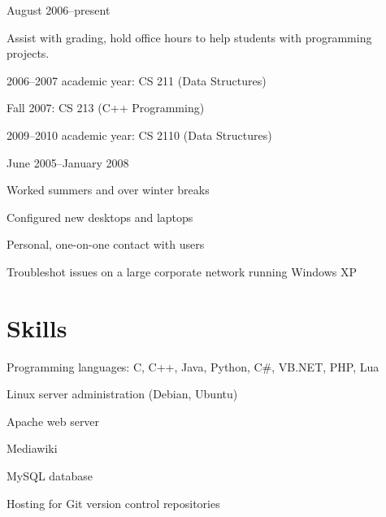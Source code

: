 \documentclass[11pt]{resume}
\begin{document}
	{August 2006--present}
	\begin{compactitem}
	\item Assist with grading, hold office hours to help students with programming
	projects.
	\item 2006--2007 academic year: CS 211 (Data Structures)
	\item Fall 2007: CS 213 (C++ Programming)
	\item 2009--2010 academic year: CS 2110 (Data Structures)
	\end{compactitem}

	{June 2005--January 2008}
	\begin{compactitem}
	\item Worked summers and over winter breaks
	\item Configured new desktops and laptops
	\item Personal, one-on-one contact with users
	\item Troubleshot issues on a large corporate network running Windows XP
	\end{compactitem}

\section{Skills}
	\vspace{\secskip}
	\begin{compactitem}
	\item Programming languages: C, C++, Java, Python, C\#, VB.NET, PHP, Lua
	\item Linux server administration (Debian, Ubuntu)
		\begin{compactitem}
		\item Apache web server
		\item Mediawiki
		\item MySQL database
		\item Hosting for Git version control repositories
		\end{compactitem}
	\end{compactitem}
\end{document}

